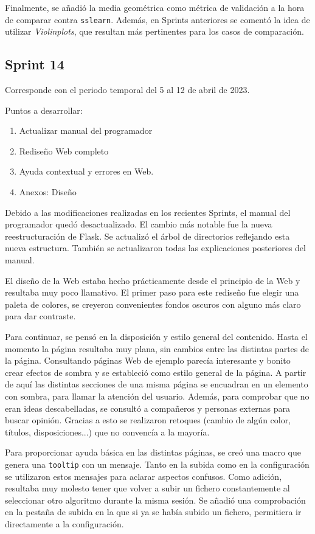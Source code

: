 Finalmente, se añadió la media geométrica como métrica de validación a la hora
de comparar contra
\texttt{sslearn}\cite{jose_luis_garrido_labrador_2023_7781117}. Además, en
Sprints anteriores se comentó la idea de utilizar \textit{Violinplots}, que
resultan más pertinentes para los casos de comparación.

\subsection{Sprint 14}
Corresponde con el periodo temporal del 5 al 12 de abril de 2023.

Puntos a desarrollar:
\begin{enumerate}
    \item Actualizar manual del programador
    \item Rediseño Web completo
    \item Ayuda contextual y errores en Web.
    \item Anexos: Diseño
\end{enumerate}

Debido a las modificaciones realizadas en los recientes Sprints, el manual del
programador quedó desactualizado. El cambio más notable fue la nueva
reestructuración de Flask. Se actualizó el árbol de directorios reflejando esta
nueva estructura. También se actualizaron todas las explicaciones posteriores
del manual.

El diseño de la Web estaba hecho prácticamente desde el principio de la Web y
resultaba muy poco llamativo. El primer paso para este rediseño fue elegir una
paleta de colores, se creyeron convenientes fondos oscuros con alguno más claro
para dar contraste.

Para continuar, se pensó en la disposición y estilo general del contenido. Hasta
el momento la página resultaba muy plana, sin cambios entre las distintas partes
de la página. Consultando páginas Web de ejemplo parecía interesante y bonito
crear efectos de sombra y se estableció como estilo general de la página. A
partir de aquí las distintas secciones de una misma página se encuadran en un
elemento con sombra, para llamar la atención del usuario. Además, para comprobar
que no eran ideas descabelladas, se consultó a compañeros y personas externas
para buscar opinión. Gracias a esto se realizaron retoques (cambio de algún
color, títulos, disposiciones...) que no convencía a la mayoría.


Para proporcionar ayuda básica en las distintas páginas, se creó una macro que
genera una \texttt{tooltip} con un mensaje. Tanto en la subida como en la
configuración se utilizaron estos mensajes para aclarar aspectos confusos. Como
adición, resultaba muy molesto tener que volver a subir un fichero
constantemente al seleccionar otro algoritmo durante la misma sesión. Se añadió
una comprobación en la pestaña de subida en la que si ya se había subido un
fichero, permitiera ir directamente a la configuración.

